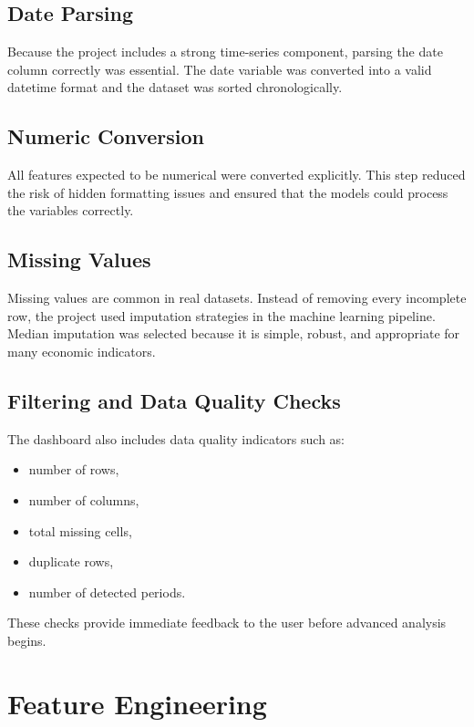 \subsection{Date Parsing}

Because the project includes a strong time-series component, parsing the date column correctly was essential.
The date variable was converted into a valid datetime format and the dataset was sorted chronologically.

\subsection{Numeric Conversion}

All features expected to be numerical were converted explicitly.
This step reduced the risk of hidden formatting issues and ensured that the models could process the variables correctly.

\subsection{Missing Values}

Missing values are common in real datasets.
Instead of removing every incomplete row, the project used imputation strategies in the machine learning pipeline.
Median imputation was selected because it is simple, robust, and appropriate for many economic indicators.

\subsection{Filtering and Data Quality Checks}

The dashboard also includes data quality indicators such as:
\begin{itemize}
\item number of rows,
\item number of columns,
\item total missing cells,
\item duplicate rows,
\item number of detected periods.
\end{itemize}

These checks provide immediate feedback to the user before advanced analysis begins.

\section{Feature Engineering}

